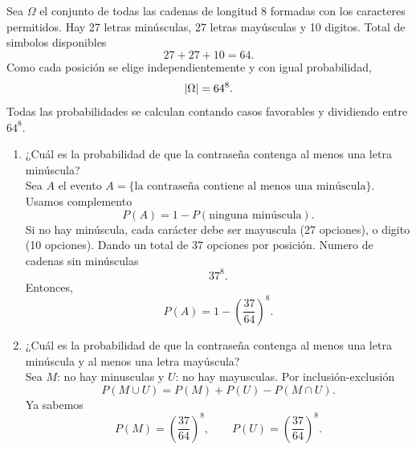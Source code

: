 \documentclass[12pt,a4paper]{article}
\begin{document}
    \begin{solucion}
        Sea $\Omega$ el conjunto de todas las cadenas de longitud 8 formadas con los caracteres
        permitidos. Hay 27 letras minúsculas, 27 letras mayúsculas y 10 digitos. Total de simbolos disponibles
        \begin{equation*}
            27+27+10=64.
        \end{equation*}
        Como cada posición se elige independientemente y con igual probabilidad,
        \begin{equation*}
            \abs{\Omega}=64^{8}.
        \end{equation*}
        Todas las probabilidades se calculan contando casos favorables y dividiendo entre $64^{8}$.
        \begin{enumerate}
            \item[(a)] ¿Cuál es la probabilidad de que la contraseña contenga al menos una letra minúscula?\\
            Sea $A$ el evento $A=\{\text{la contraseña contiene al menos una minúscula}\}$. Usamos complemento
            \begin{equation*}
                P(A)=1-P(\text{ninguna minúscula}).
            \end{equation*}
            Si no hay minúscula, cada carácter debe ser mayuscula (27 opciones), o digito (10 opciones).
            Dando un total de 37 opciones por posición. Numero de cadenas sin minúsculas
            \begin{equation*}
                37^{8}.
            \end{equation*}
            Entonces,
            \begin{equation*}
                P(A)=1-\left(\frac{37}{64}\right)^{8}.
            \end{equation*}
            \item[(b)] ¿Cuál es la probabilidad de que la contraseña contenga al menos una letra minúscula y al menos una letra mayúscula?\\
            Sea $M$: no hay minusculas y $U$: no hay mayusculas. Por inclusión-exclusión
            \begin{equation*}
                P(M\cup U)=P(M)+P(U)-P(M\cap U).
            \end{equation*}
            Ya sabemos
            \begin{equation*}
                P(M)=\left(\frac{37}{64}\right)^{8},\qquad P(U)=\left(\frac{37}{64}\right)^{8}.
            \end{equation*}

\end{enumerate}
\end{solucion}
\end{document}

